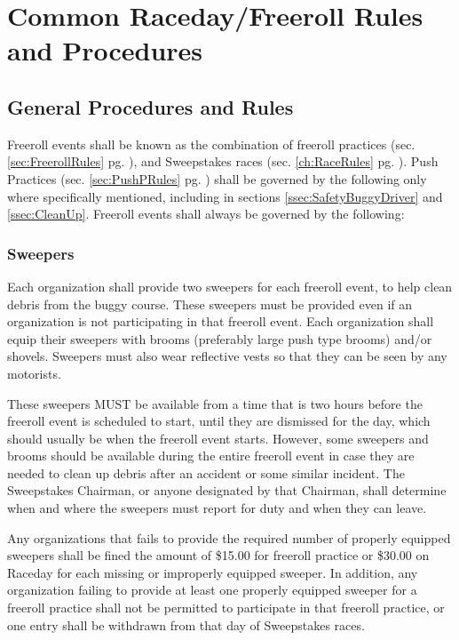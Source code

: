 \chapter{Common Raceday/Freeroll Rules and Procedures}
\label{ch:CommonRules}

\section{General Procedures and Rules}
	Freeroll events shall be known as the combination of freeroll practices 
	(sec. \ref{sec:FreerollRules} pg. \pageref{sec:FreerollRules}), and Sweepstakes races 
	(sec. \ref{ch:RaceRules} pg. \pageref{ch:RaceRules}). Push Practices 
	(sec. \ref{sec:PushPRules} pg. \pageref{sec:PushPRules}) shall 
	be governed by the following only where specifically mentioned, including 
	in sections \ref{ssec:SafetyBuggyDriver} and \ref{ssec:CleanUp}. Freeroll 
	events shall always be governed by the following:

\subsection{Sweepers}
\label{subsec:Sweepers}

	Each organization shall provide two sweepers for each freeroll event, to
	help clean debris from the buggy course. These sweepers must be provided even
	if an organization is not participating in that freeroll event. Each
	organization shall equip their sweepers with brooms (preferably large push type
	brooms) and/or shovels. Sweepers must also wear reflective vests so that they
	can be seen by any motorists.

	These sweepers MUST be available from a time that is two hours before the
	freeroll event is scheduled to start, until they are dismissed for the day,
	which should usually be when the freeroll event starts. However, some
	sweepers and brooms should be available during the entire freeroll event in
	case they are needed to clean up debris after an accident or some similar
	incident. The Sweepstakes Chairman, or anyone designated by that Chairman,
	shall determine when and where the sweepers must report for duty and when they
	can leave.

	Any organizations that fails to provide the required number of properly
	equipped sweepers shall be fined the amount of \$15.00 for freeroll practice or 
	\$30.00 on Raceday for each missing or improperly equipped sweeper. In addition, 
	any organization failing to provide at least one properly equipped sweeper for a
	freeroll practice shall not be permitted to participate in that freeroll practice,
	or one entry shall be withdrawn from that day of Sweepstakes races.

